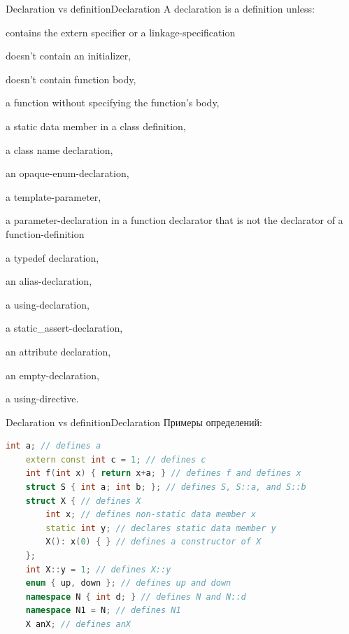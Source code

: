 \documentclass[10pt]{beamer}
\begin{document}
\begin{frame}[fragile]{Declaration vs definition}{Declaration}
A declaration is a definition unless:
\begin{enumerate}
\begin{multicols}{2}
\item contains the extern specifier or a linkage-specification
\item doesn't contain an initializer,
\item doesn't contain function body,
\item a function without specifying the function’s body, 
\item a static data member in a class definition, 
\item a class name declaration, 
\item an opaque-enum-declaration, 
\item a template-parameter, 
\vfill\eject
\item a parameter-declaration in a function declarator that is not the declarator of a function-definition
\item a typedef declaration,
\item an alias-declaration, 
\item a using-declaration, 
\item a static\_assert-declaration, 
\item an attribute declaration,
\item an empty-declaration, 
\item a using-directive.
\end{multicols}
\end{enumerate}
\end{frame}


\begin{frame}[fragile]{Declaration vs definition}{Declaration}
Примеры определений:
    \begin{lstlisting}[language=C++]
    int a; // defines a
    extern const int c = 1; // defines c
    int f(int x) { return x+a; } // defines f and defines x
    struct S { int a; int b; }; // defines S, S::a, and S::b
    struct X { // defines X
        int x; // defines non-static data member x
        static int y; // declares static data member y
        X(): x(0) { } // defines a constructor of X
    };
    int X::y = 1; // defines X::y
    enum { up, down }; // defines up and down
    namespace N { int d; } // defines N and N::d
    namespace N1 = N; // defines N1
    X anX; // defines anX
    \end{lstlisting}
\end{frame}
\end{document}
